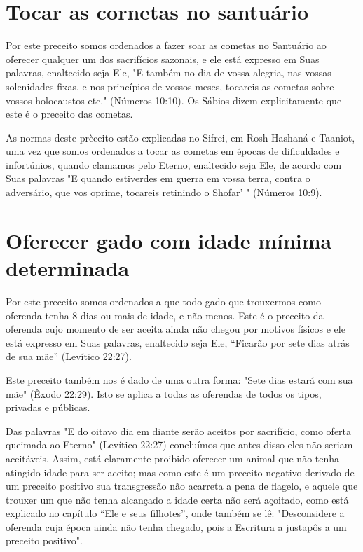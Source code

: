 \section{Tocar as cornetas no santuário}


Por este preceito somos ordenados a fazer soar as cometas no San­tuário
ao oferecer qualquer um dos sacrifícios sazonais, e ele está expresso em
Suas palavras, enaltecido seja Ele, "E também no dia de vossa alegria,
nas vos­sas solenidades fixas, e nos princípios de vossos meses,
tocareis as cometas so­bre vossos holocaustos etc." (Números 10:10). Os
Sábios dizem explicitamen­te que este é o preceito das cometas.

As normas deste prèceito estão explicadas no Sifrei, em Rosh Hashaná e
Taaniot, uma vez que somos ordenados a tocar as cometas em épocas de
difi­culdades e infortúnios, quando clamamos pelo Eterno, enaltecido
seja Ele, de acor­do com Suas palavras "E quando estiverdes em guerra em
vossa terra, contra o adversário, que vos oprime, tocareis retinindo o
Shofar' " (Números 10:9).

\section{Oferecer gado com idade mínima determinada}

Por este preceito somos ordenados a que todo gado que trouxer­mos como
oferenda tenha 8 dias ou mais de idade, e não menos. Este é o pre­ceito
da oferenda cujo momento de ser aceita ainda não chegou por motivos
físicos e ele está expresso em Suas palavras, enaltecido seja Ele,
``Ficarão por sete dias atrás de sua mãe'' (Levítico 22:27).

Este preceito também nos é dado de uma outra forma: "Sete dias estará
com sua mãe" (Êxodo 22:29). Isto se aplica a todas as oferendas de todos
os tipos, privadas e públicas.

Das palavras "E do oitavo dia em diante serão aceitos por sacrifício,
como oferta queimada ao Eterno" (Levítico 22:27) concluímos que antes
disso eles não seriam aceitáveis. Assim, está claramente proibido
oferecer um animal que não tenha atingido idade para ser aceito; mas
como este é um preceito ne­gativo derivado de um preceito positivo sua
transgressão não acarreta a pena de flagelo, e aquele que trouxer um que
não tenha alcançado a idade certa não será açoitado, como está explicado
no capítulo ``Ele e seus filhotes'', onde tam­bém se lê: "Desconsidere a
oferenda cuja época ainda não tenha chegado, pois a Escritura a justapôs
a um preceito positivo".


